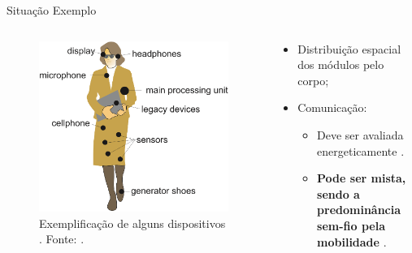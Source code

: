       \begin{frame}{\Wearables}{Situação Exemplo} \vspace{-1em}
         \begin{columns}
            \begin{column}{0.6\textwidth}
               \begin{figure}[h] \centering
                  \includegraphics[width=1\textwidth]{img/into-wearable2.png}
                  \caption{Exemplificação de alguns dispositivos \wearables. Fonte: \cite{Plessl2003}.}
                  \label{fig:into-wearable}
               \end{figure}
            \end{column}
            \begin{column}{0.4\textwidth}
               \begin{itemize}
                  \item 
                  Distribuição espacial dos módulos pelo corpo;
                  
                  \item Comunicação:
                  \begin{itemize}
                     \setlength{\itemsep}{1.5em}
                     \item Deve ser avaliada energeticamente \cite{Kymissis1998}.
                     \item \textbf{Pode ser mista, sendo a predominância sem-fio pela mobilidade} \cite{Plessl2003}.
                  \end{itemize}
               \end{itemize}
               
            \end{column}
         \end{columns}
         
      \end{frame}
      
